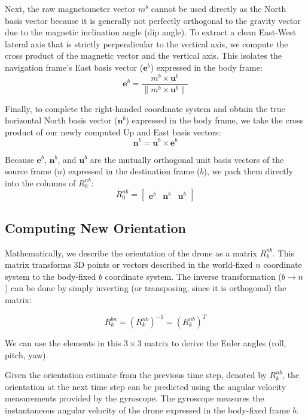 \documentclass{article}
\begin{document}
\noindent Next, the raw magnetometer vector $m^b$ cannot be used directly as the North basis vector because it is generally not perfectly orthogonal to the gravity vector due to the magnetic inclination angle (dip angle). To extract a clean East-West lateral axis that is strictly perpendicular to the vertical axis, we compute the cross product of the magnetic vector and the vertical axis. This isolates the navigation frame's East basis vector ($\mathbf{e}^b$) expressed in the body frame:
\[
\mathbf{e}^b = \frac{m^b \times \mathbf{u}^b}{\|m^b \times \mathbf{u}^b\|}
\]

\noindent Finally, to complete the right-handed coordinate system and obtain the true horizontal North basis vector ($\mathbf{n}^b$) expressed in the body frame, we take the cross product of our newly computed Up and East basis vectors:
\[
\mathbf{n}^b = \mathbf{u}^b \times \mathbf{e}^b
\]

\noindent Because $\mathbf{e}^b$, $\mathbf{n}^b$, and $\mathbf{u}^b$ are the mutually orthogonal unit basis vectors of the source frame ($n$) expressed in the destination frame ($b$), we pack them directly into the columns of $R_0^{nb}$:
\[
R_0^{nb} =
\begin{bmatrix}
	\mathbf{e}^b & \mathbf{n}^b & \mathbf{u}^b
\end{bmatrix}
\]



\subsection{Computing New Orientation}

Mathematically, we describe the orientation of the drone as a matrix $R_{k}^{nb}$. This matrix transforms 3D points or vectors described in the world-fixed $n$ coordinate system to the body-fixed $b$ coordinate system. The inverse transformation ($b \rightarrow n$) can be done by simply inverting (or transposing, since it is orthogonal) the matrix:

\[
R^{bn}_k = (R^{nb}_k)^{-1} = (R^{nb}_k)^{T}
\]

\noindent We can use the elements in this $3\times3$ matrix to derive the Euler angles (roll, pitch, yaw).
\vspace{1em}

\noindent Given the orientation estimate from the previous time step, denoted by $R_k^{nb}$, the orientation at the next time step can be predicted using the angular velocity measurements provided by the gyroscope. The gyroscope measures the instantaneous angular velocity of the drone expressed in the body-fixed frame $b$.
\end{document}

